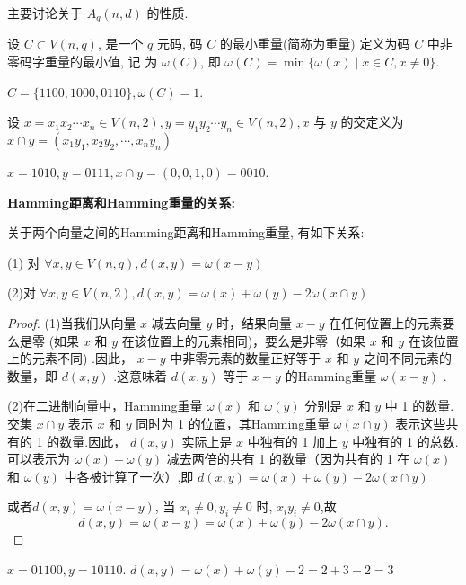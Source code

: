主要讨论关于 $ A_{q}(n, d) $ 的性质.
\begin{definition}[码 $ C $ 的最小重量: ]
    设 $ C \subset V(n, q) $, 是一个 $ q $ 元码, 码 $ C $ 的最小重量(简称为重量) 定义为码 $ C $ 中非零码字重量的最小值, 记
为 $ \omega(C) $, 即 $ \omega(C)=\min \{\omega(x) \mid x \in C, x \neq 0\} $.
\end{definition}
\begin{example}
    $ C=\{1100,1000,0110\}, \omega(C)=1 $.
\end{example}
\begin{definition}
    设 $ x=x_{1} x_{2} \cdots x_{n} \in V(n, 2), y=y_{1}y_2 \cdots y_{n} \in V(n, 2), x $ 与 $ y $ 的交定义为 $ x \cap y=\left(x_{1} y_{1}, x_{2} y_{2}, \cdots, x_{n} y_{n}\right) $
\end{definition}
\begin{example}
    $ x=1010, y=0111, x \cap y=(0,0,1,0)=0010 $.
\end{example}

\textbf{Hamming距离和Hamming重量的关系:}
\begin{lemma}
    关于两个向量之间的Hamming距离和Hamming重量, 有如下关系:
    
(1) 对 $ \forall x, y \in V(n, q), d(x, y)=\omega(x-y) $

(2)对 $ \forall x, y \in V(n, 2), d(x, y)=\omega(x)+\omega(y)-2 \omega(x \cap y) $
\end{lemma}
\begin{proof}
    (1)当我们从向量 $ x $ 减去向量 $ y $ 时，结果向量 $ x-y $ 在任何位置上的元素要么是零 (如果 $ x $ 和 $ y $ 在该位置上的元素相同)，要么是非零（如果 $ x $ 和 $ y $ 在该位置上的元素不同) .因此， $ x-y $ 中非零元素的数量正好等于 $ x $ 和 $ y $ 之间不同元素的数量，即 $ d(x, y) $ .这意味着 $ d(x, y) $ 等于 $ x-y $ 的Hamming重量 $ \omega(x-y) $ .

(2)在二进制向量中，Hamming重量 $ \omega(x) $ 和 $ \omega(y) $ 分别是 $ x $ 和 $ y $ 中 1 的数量.交集 $ x \cap y $ 表示 $ x $ 和 $ y $ 同时为 1 的位置，其Hamming重量 $ \omega(x \cap y) $ 表示这些共有的 1 的数量.因此， $ d(x, y) $ 实际上是 $ x $ 中独有的 1 加上 $ y $ 中独有的 1 的总数.可以表示为 $ \omega(x)+\omega(y) $ 减去两倍的共有 1 的数量（因为共有的 1 在 $ \omega(x) $ 和 $ \omega(y) $ 中各被计算了一次）,即 $ d(x, y)=\omega(x)+\omega(y)-2 \omega(x \cap y) $
    
 或者$ d(x, y)=\omega(x-y) $, 当 $ x_{i} \neq 0, y_{i} \neq 0 $ 时, $ x_{i} y_{i} \neq 0 $,故
$$
d(x, y)=\omega(x-y)=\omega(x)+\omega(y)-2 \omega(x \cap y) .
$$
\end{proof} 
\begin{example}
    $ x=01100, y=10110 $.
$
d(x, y)=\omega(x)+\omega(y)-2=2+3-2=3
$
\end{example}

